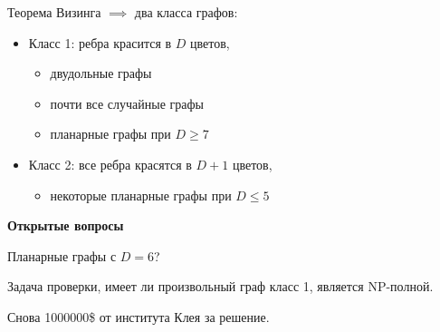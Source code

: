 Теорема Визинга $\implies$ два класса графов:
\begin{itemize}
    \item Класс 1: ребра красится в $D$ цветов,
    \begin{itemize}
        \item двудольные графы
        
        \item почти все случайные графы
        
        \item планарные графы при $D \geq 7$
    \end{itemize}
    
    \item Класс 2: все ребра красятся в $D + 1$ цветов,
    \begin{itemize}
        \item некоторые планарные графы при $D \leq 5$
    \end{itemize}
\end{itemize}

\textbf{Открытые вопросы}

Планарные графы с $D = 6$?

Задача проверки, имеет ли произвольный граф класс 1, является NP-полной.

Снова 1000000\$ от института Клея за решение.